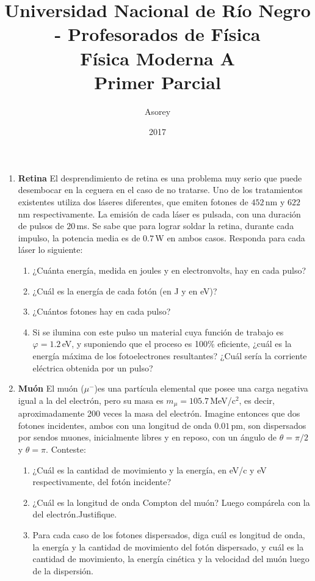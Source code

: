 \documentclass[a4paper,12pt]{article}
\begin{document}
\title{
{\normalsize{Universidad Nacional de Río Negro - Profesorados de Física}}\\
Física Moderna A \\ Primer Parcial\\}
\author{Asorey}
\date{2017}
\maketitle

\begin{enumerate}
\setcounter{enumi}{0}

\item {\bf{Retina}}
	El desprendimiento de retina es una problema muy serio que puede desembocar
		en la ceguera en el caso de no tratarse. Uno de los tratamientos
		existentes utiliza dos láseres diferentes, que emiten fotones de
		$452$\,nm y $622$\,nm respectivamente. La emisión de cada láser es
		pulsada, con una duración de pulsos de $20$\,ms. Se sabe que para
		lograr soldar la retina, durante cada impulso, la potencia media es de
		$0.7$\,W en ambos casos. Responda para cada láser lo siguiente:
	\begin{enumerate}
		\item ¿Cuánta energía, medida en joules y en electronvolts, hay en
			cada pulso?
		\item ¿Cuál es la energía de cada fotón (en J y en eV)?
		\item ¿Cuántos fotones hay en cada pulso?
		\item Si se ilumina con este pulso un material cuya función de trabajo
			es $\varphi=1.2$\,eV, y suponiendo que el proceso es 100\%
			eficiente, ¿cuál es la energía máxima de los fotoelectrones
			resultantes? ¿Cuál sería la corriente eléctrica obtenida por un
			pulso?
	\end{enumerate}

\item {\bf{Muón}}
	El muón ($\mu^{-}$)es una partícula elemental que posee una carga negativa
		igual a la del electrón, pero su masa es $m_\mu = 105.7$\,MeV/c$^2$, es
		decir, aproximadamente 200 veces la masa del electrón. Imagine entonces
		que dos fotones incidentes, ambos con una longitud de onda $0.01$\,pm,
		son dispersados por sendos muones, inicialmente libres y en reposo, con
		un ángulo de $\theta=\pi/2$ y
		$\theta = \pi$. Conteste:
	\begin{enumerate}
		\item ¿Cuál es la cantidad de movimiento y la energía, en eV/c y eV
			respectivamente, del fotón incidente?
		\item ¿Cuál es la longitud de onda Compton del muón? Luego compárela
			con la del electrón.Justifique.
		\item Para cada caso de los fotones dispersados, diga cuál es longitud
			de onda, la energía y la cantidad de movimiento del fotón
			dispersado, y cuál es la cantidad de movimiento, la energía
			cinética y la velocidad del muón luego de la dispersión.
	\end{enumerate}


\end{enumerate}
\end{document}
